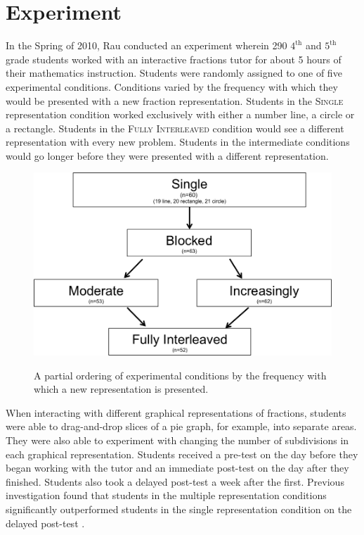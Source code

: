 \documentclass{edm_template}
\newcommand{\mgr}[1]{\textsc{#1}}
\begin{document}
\section{Experiment}
\label{sec:experiment}

In the Spring of 2010, Rau conducted an experiment wherein 290 $4^\text{th}$ and $5^\text{th}$ grade students worked with an interactive fractions tutor for about 5 hours of their mathematics instruction. Students were randomly assigned to one of five experimental conditions. Conditions varied by the frequency with which they would be presented with a new fraction representation. Students in the \mgr{Single} representation condition worked exclusively with either a number line, a circle or a rectangle. Students in the \mgr{Fully Interleaved} condition would see a different representation with every new problem. Students in the intermediate conditions would go longer before they were presented with a different representation.   
\begin{figure}[htbp]
\centering
\includegraphics[scale=.4]{conditionGraph.png}\\
\caption{A partial ordering of experimental conditions by the frequency with which a new representation is presented. }
\label{fig:condition-graph}
\end{figure}

When interacting with different graphical representations of fractions, students were able to drag-and-drop slices of a pie graph, for example, into separate areas. They were also able to experiment with changing the number of subdivisions in each graphical representation. Students received a pre-test on the day before they began working with the tutor and an immediate post-test on the day after they finished. Students also took a delayed post-test a week after the first. Previous investigation found that students in the multiple representation conditions significantly outperformed students in the single representation condition on the delayed post-test \cite{Rau2012}. 
\end{document}
